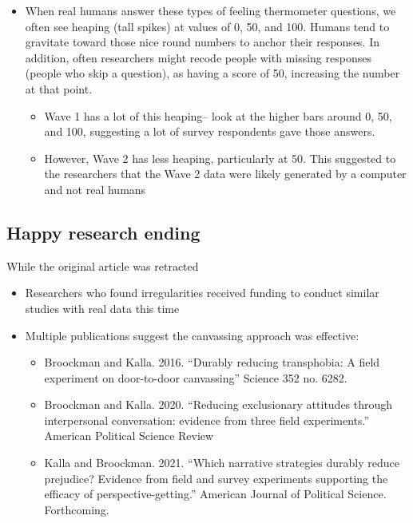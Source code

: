 \documentclass[
  letterpaper,
  DIV=11,
  numbers=noendperiod]{scrreprt}
\providecommand{\tightlist}{%
  \setlength{\itemsep}{0pt}\setlength{\parskip}{0pt}}\usepackage{longtable,booktabs,array}
\begin{document}
\begin{itemize}
\tightlist
\item
  When real humans answer these types of feeling thermometer questions,
  we often see heaping (tall spikes) at values of 0, 50, and 100. Humans
  tend to gravitate toward those nice round numbers to anchor their
  responses. In addition, often researchers might recode people with
  missing responses (people who skip a question), as having a score of
  50, increasing the number at that point.

  \begin{itemize}
  \tightlist
  \item
    Wave 1 has a lot of this heaping-- look at the higher bars around 0,
    50, and 100, suggesting a lot of survey respondents gave those
    answers.
  \item
    However, Wave 2 has less heaping, particularly at 50. This suggested
    to the researchers that the Wave 2 data were likely generated by a
    computer and not real humans
  \end{itemize}
\end{itemize}

\hypertarget{happy-research-ending}{%
\subsection{Happy research ending}\label{happy-research-ending}}

While the original article was retracted

\begin{itemize}
\tightlist
\item
  Researchers who found irregularities received funding to conduct
  similar studies with real data this time
\item
  Multiple publications suggest the canvassing approach was effective:

  \begin{itemize}
  \tightlist
  \item
    Broockman and Kalla. 2016. ``Durably reducing transphobia: A field
    experiment on door-to-door canvassing'' Science 352 no. 6282.
  \item
    Broockman and Kalla. 2020. ``Reducing exclusionary attitudes through
    interpersonal conversation: evidence from three field experiments.''
    American Political Science Review
  \item
    Kalla and Broockman. 2021. ``Which narrative strategies durably
    reduce prejudice? Evidence from field and survey experiments
    supporting the efficacy of perspective-getting.'' American Journal
    of Political Science. Forthcoming.
  \end{itemize}
\end{itemize}
\end{document}
